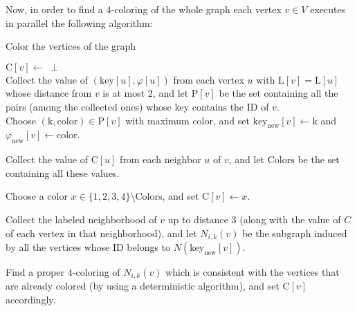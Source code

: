 \documentclass{article}
\theoremstyle{definition}
\def\shiri#1{\textcolor{red}{[Shiri: #1]}}
\begin{document}
\begin{algorithm}[H]
\label{alg2:col}
 \end{algorithm}\medskip \smallskip

Now, in order to find a $4$-coloring of the whole graph each vertex $v \in V$ executes in parallel the following algorithm: \medskip \smallskip


\begin{algorithm}[H]\label{AlgColorGraph}\small
	\caption{Color the vertices of the graph}
\SetInd{1em}{0em}
$\text{C}[v] \gets \;\perp$\\
Collect the value of $(\text{key}[u], \varphi[u])$ from each vertex $u$ with $\text{L}[v] = \text{L}[u]$ whose distance from $v$ is at most $2$, and let $\text{P}[v]$ be the set containing all the pairs (among the collected ones) whose key contains the ID of $v$.\\ \label{line:collectCycle}
Choose $(\text{k},\text{color}) \in \text{P}[v]$ with maximum color, and set $\text{key}_{\text{new}}[v] \gets \text{k}$ and $\varphi_{\text{new}}[v] \gets \text{color}$.\label{line:chooseCycle}

	 { \label{line:outer}

		     { \label{line:innerStep1}
		Collect the value of $\text{C}[u]$ from each neighbor $u$ of $v$, and let $\text{Colors}$ be the set containing all these values.


               { \label{line:innerCond1}
		Choose a color $x \in \{1,2,3,4\} \setminus \text{Colors}$, and set $\text{C}[v] \gets x$.\label{line:ColorVertex}
      }}

                   \smallskip{}
		     { \label{alg2:inner}
		Collect the labeled neighborhood of $v$ up to distance $3$ (along with the value of $C$ of each vertex in that neighborhood), and let $N_{i,k}(v)$ be the subgraph induced by all the vertices whose ID belongs to $N(\text{key}_{\text{new}}[v])$.

               {\label{line:innerCond2}
Find a proper $4$-coloring of $N_{i,k}(v)$ which is consistent with the vertices that are already colored (by using a deterministic algorithm), and set $\text{C}[v]$ accordingly.  \label{line:ColorRemovable}

}}}

\label{alg:finalColor}
\end{algorithm}\medskip \smallskip
\end{document}
